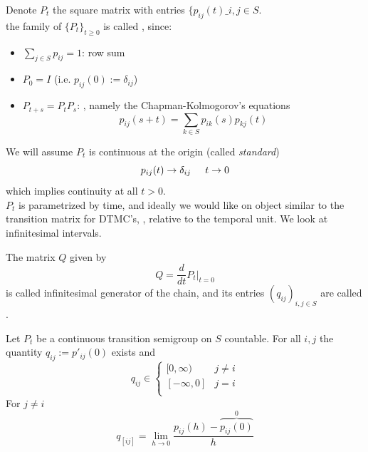 \documentclass{article}
\begin{document}
Denote $P_t$ the square matrix with entries $\{p_{ij}(t)\_{i, j \in S}$. \\
 the family of $\{P_t\}_{t\geqslant 0}$ is called , since:
 \begin{itemize}
     \item $\sum_{j \in S} p_{ij} = 1$: row sum
     \item $P_0=I$ (i.e. $p_{ij}(0):=\delta_{ij}$)
     \item $P_{t+s}= P_t P_s$:  , namely the Chapman-Kolmogorov's equations 
     \begin{equation*}
         p_{ij}(s+t)= \sum_{k \in S} p_{ik}(s) p_{kj}(t)
     \end{equation*}
 \end{itemize}
 We will assume $P_t$ is continuous at the origin (called \textit{standard})
\begin{equation*}
    p_{ij}(t) \rightarrow \delta_{ij} \hspace{0.5 cm} t \rightarrow 0
\end{equation*}
which implies continuity at all $t>0$.\\
$P_t$ is parametrized by time, and ideally we would like on object similar to the transition matrix for DTMC's, , relative to the temporal unit. We look at infinitesimal intervals. 
\begin{definition}
    The matrix $Q$ given by 
    \begin{equation*}
        Q= \frac{d}{dt}P_t |_{t=0}
    \end{equation*}
    is called infinitesimal generator of the chain, and its entries $(q_{ij})_{i,j \in S}$ are called .
\end{definition}
\begin{proposition}
    Let $P_t$ be a continuous transition semigroup on $S$ countable. For all $i,j$ the quantity $q_{ij}:=p'_{ij}(0)$ exists and 
        \[q_{ij} \in
        \begin{cases}
            [0,\infty) & j \neq i \\
            [-\infty, 0] & j = i \\
        \end{cases}
        \]
        For $j \neq i$
        \begin{equation*}
            q_[ij] = \lim_{h \rightarrow 0} \frac{p_{ij}(h) - \overbrace{p_{ij}(0)}^{0}}{h}
        \end{equation*}
        \end{proposition}
\end{document}
